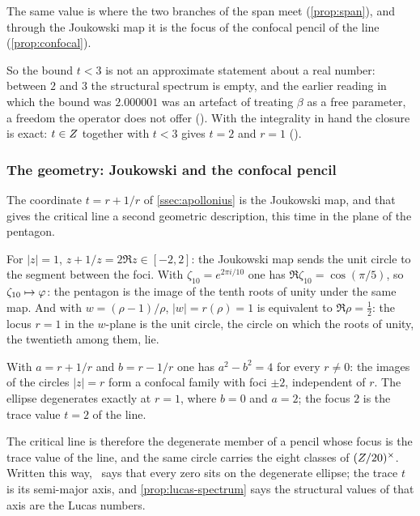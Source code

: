 The same value is where the two branches of the span meet (\cref{prop:span}), and
through the Joukowski map it is the focus of the confocal pencil of the line
(\cref{prop:confocal}).

So the bound $t<3$ is not an approximate statement about a real number: between
$2$ and $3$ the structural spectrum is empty, and the earlier reading in which
the bound was $2.000001$ was an artefact of treating $\beta$ as a free parameter,
a freedom the operator does not offer ().
With the integrality in hand the closure is exact:
$t\in Z$ together with $t<3$ gives $t=2$ and $r=1$
().

\subsubsection{The geometry: Joukowski and the confocal pencil}\label{ssec:joukowski}

The coordinate $t=r+1/r$ of \cref{ssec:apollonius} is the Joukowski map, and that
gives the critical line a second geometric description, this time in the plane of
the pentagon.

\begin{proposition}\label{prop:joukowski}
For $|z|=1$, $z+1/z=2\Re z\in[-2,2]$: the Joukowski map sends the unit circle to
the segment between the foci.  With $\zeta_{10}=e^{2\pi i/10}$ one has
$\Re\zeta_{10}=\cos(\pi/5)$, so $\zeta_{10}\mapsto\varphi$: the pentagon is the
image of the tenth roots of unity under the same map.  And with
$w=(\rho-1)/\rho$, $|w|=r(\rho)=1$ is equivalent to $\Re\rho=\tfrac12$: the locus $r=1$ in
the $w$-plane is the unit circle, the circle on which the roots of unity, the
twentieth among them, lie.
%
\end{proposition}

\begin{proposition}\label{prop:confocal}
With $a=r+1/r$ and $b=r-1/r$ one has $a^2-b^2=4$ for every $r\ne0$: the images of
the circles $|z|=r$ form a confocal family with foci $\pm2$, independent of $r$.
The ellipse degenerates exactly at $r=1$, where $b=0$ and $a=2$; the focus $2$ is
the trace value $t=2$ of the line.
%
\end{proposition}

The critical line is therefore the degenerate member of a pencil whose focus is
the trace value of the line, and the same circle carries the eight classes of
$(Z/20)^{\times}$.  Written this way, \Ecore\ says that every zero sits on the degenerate
ellipse; the trace $t$ is its semi-major axis, and \cref{prop:lucas-spectrum} says the structural values of that axis are the Lucas numbers.



